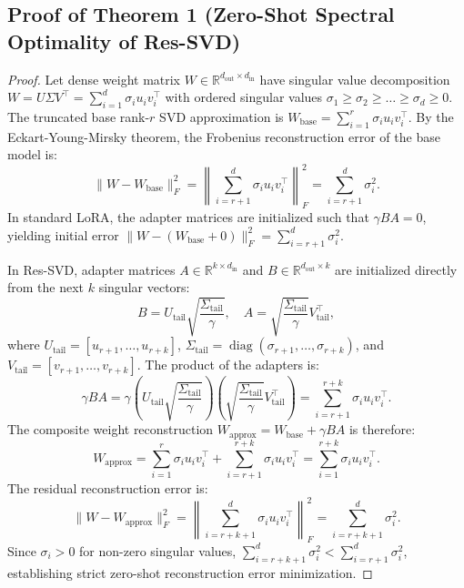 \documentclass[10pt,twocolumn,letterpaper]{article}
\begin{document}
\subsection{Proof of Theorem 1 (Zero-Shot Spectral Optimality of Res-SVD)}
\begin{proof}
Let dense weight matrix $W \in \mathbb{R}^{d_{\text{out}} \times d_{\text{in}}}$ have singular value decomposition $W = U \Sigma V^\top = \sum_{i=1}^d \sigma_i u_i v_i^\top$ with ordered singular values $\sigma_1 \ge \sigma_2 \ge \dots \ge \sigma_d \ge 0$.
The truncated base rank-$r$ SVD approximation is $W_{\text{base}} = \sum_{i=1}^r \sigma_i u_i v_i^\top$. By the Eckart-Young-Mirsky theorem, the Frobenius reconstruction error of the base model is:
\begin{equation}
\|W - W_{\text{base}}\|_F^2 = \left\| \sum_{i=r+1}^d \sigma_i u_i v_i^\top \right\|_F^2 = \sum_{i=r+1}^d \sigma_i^2.
\end{equation}
In standard LoRA, the adapter matrices are initialized such that $\gamma B A = 0$, yielding initial error $\|W - (W_{\text{base}} + 0)\|_F^2 = \sum_{i=r+1}^d \sigma_i^2$.

In Res-SVD, adapter matrices $A \in \mathbb{R}^{k \times d_{\text{in}}}$ and $B \in \mathbb{R}^{d_{\text{out}} \times k}$ are initialized directly from the next $k$ singular vectors:
\begin{equation}
B = U_{\text{tail}} \sqrt{\frac{\Sigma_{\text{tail}}}{\gamma}}, \quad A = \sqrt{\frac{\Sigma_{\text{tail}}}{\gamma}} V_{\text{tail}}^\top,
\end{equation}
where $U_{\text{tail}} = [u_{r+1}, \dots, u_{r+k}]$, $\Sigma_{\text{tail}} = \operatorname{diag}(\sigma_{r+1}, \dots, \sigma_{r+k})$, and $V_{\text{tail}} = [v_{r+1}, \dots, v_{r+k}]$.
The product of the adapters is:
\begin{equation}
\gamma B A = \gamma \left( U_{\text{tail}} \sqrt{\frac{\Sigma_{\text{tail}}}{\gamma}} \right) \left( \sqrt{\frac{\Sigma_{\text{tail}}}{\gamma}} V_{\text{tail}}^\top \right) = \sum_{i=r+1}^{r+k} \sigma_i u_i v_i^\top.
\end{equation}
The composite weight reconstruction $W_{\text{approx}} = W_{\text{base}} + \gamma B A$ is therefore:
\begin{equation}
W_{\text{approx}} = \sum_{i=1}^r \sigma_i u_i v_i^\top + \sum_{i=r+1}^{r+k} \sigma_i u_i v_i^\top = \sum_{i=1}^{r+k} \sigma_i u_i v_i^\top.
\end{equation}
The residual reconstruction error is:
\begin{equation}
\|W - W_{\text{approx}}\|_F^2 = \left\| \sum_{i=r+k+1}^d \sigma_i u_i v_i^\top \right\|_F^2 = \sum_{i=r+k+1}^d \sigma_i^2.
\end{equation}
Since $\sigma_i > 0$ for non-zero singular values, $\sum_{i=r+k+1}^d \sigma_i^2 < \sum_{i=r+1}^d \sigma_i^2$, establishing strict zero-shot reconstruction error minimization.
\end{proof}
\end{document}
